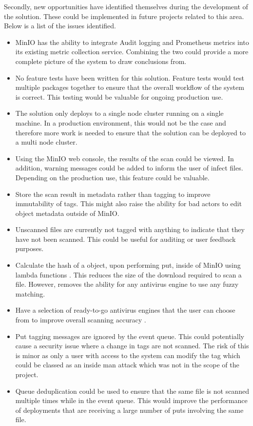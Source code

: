 \documentclass[12pt, conference, final, a4paper, onecolumn, compsoc]{IEEEtran}
\begin{document}
Secondly, new opportunities have identified themselves during the development of
the solution. These could be implemented in future projects related to this
area. Below is a list of the issues identified.

\begin{itemize}
  \item MinIO has the ability to integrate Audit logging and Prometheus metrics
        into its existing metric collection service. Combining the two could
        provide a more complete picture of the system to draw conclusions from.
  \item No feature tests have been written for this solution. Feature tests
        would test multiple packages together to ensure that the overall
        workflow of the system is correct. This testing would be valuable for
        ongoing production use.
  \item The solution only deploys to a single node cluster running on a single
        machine. In a production environment, this would not be the case and
        therefore more work is needed to ensure that the solution can be
        deployed to a multi node cluster.
  \item Using the MinIO web console, the results of the scan could be viewed. In
        addition, warning messages could be added to inform the user of infect
        files. Depending on the production use, this feature could be valuable.
  \item Store the scan result in metadata rather than tagging to improve
        immutability of tags. This might also raise the ability for bad actors
        to edit object metadata outside of MinIO.
  \item Unscanned files are currently not tagged with anything to indicate that
        they have not been scanned. This could be useful for auditing or user
        feedback purposes.
  \item Calculate the hash of a object, upon performing put, inside of MinIO
        using lambda functions \citep{minio-lambda}. This reduces the size of
        the download required to scan a file. However, removes the ability for any
        antivirus engine to use any fuzzy matching.
  \item Have a selection of ready-to-go antivirus engines that the user can
        choose from to improve overall scanning accuracy \citep{av-comparison}.
  \item Put tagging messages are ignored by the event queue. This could
        potentially cause a security issue where a change in tags are not
        scanned. The risk of this is minor as only a user with access to the
        system can modify the tag which could be classed as an inside man attack
        which was not in the scope of the project.
  \item Queue deduplication could be used to ensure that the same file is not
        scanned multiple times while in the event queue. This would improve the
        performance of deployments that are receiving a large number of puts
        involving the same file.
\end{itemize}
\end{document}
